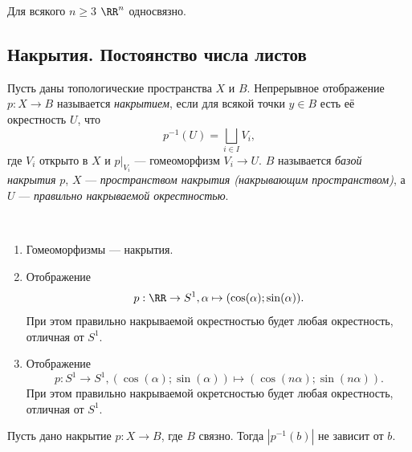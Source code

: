 \documentclass[12pt,a4paper]{article}
\begin{document}
    \begin{corollary}
        Для всякого $n \geqslant 3$ $\RR^n$ односвязно.
    \end{corollary}

    \subsection{Накрытия. Постоянство числа листов}
    
    \begin{definition}
        Пусть даны топологические пространства $X$ и $B$. Непрерывное отображение $p: X \to B$ называется \emph{накрытием}, если для всякой точки $y \in B$ есть её окрестность $U$, что
        \[p^{-1}(U) = \bigsqcup_{i \in I} V_i,\]
        где $V_i$ открыто в $X$ и $p|_{V_i}$ --- гомеоморфизм $V_i \to U$. $B$ называется \emph{базой накрытия} $p$, $X$ --- \emph{пространством накрытия (накрывающим пространством)}, а $U$ --- \emph{правильно накрываемой окрестностью}.
    \end{definition}

    \begin{example}\ 
        \begin{enumerate}
            \item Гомеоморфизмы --- накрытия.
            \item Отображение
                \[p: \RR \to S^1, \alpha \mapsto (\cos(\alpha); \sin(\alpha)).\]
                При этом правильно накрываемой окрестностью будет любая окрестность, отличная от $S^1$.
            \item Отображение
                \[p: S^1 \to S^1, (\cos(\alpha); \sin(\alpha)) \mapsto (\cos(n \alpha); \sin(n \alpha)).\]
                При этом правильно накрываемой окретсностью будет любая окрестность, отличная от $S^1$.
        \end{enumerate}
    \end{example}

    \begin{theorem}
        Пусть дано накрытие $p: X \to B$, где $B$ связно. Тогда $|p^{-1}(b)|$ не зависит от $b$.
    \end{theorem}
\end{document}
